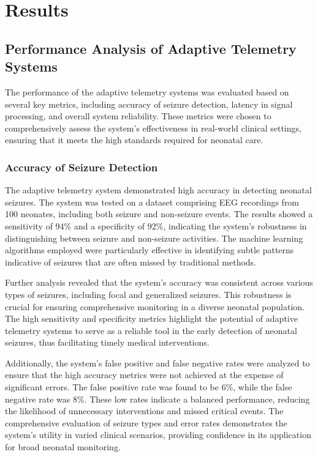 \documentclass[12pt,journal,compsoc]{IEEEtran}
\begin{document}
\section{Results}

\subsection{Performance Analysis of Adaptive Telemetry Systems}

The performance of the adaptive telemetry systems was evaluated based on several key metrics, including accuracy of seizure detection, latency in signal processing, and overall system reliability. These metrics were chosen to comprehensively assess the system's effectiveness in real-world clinical settings, ensuring that it meets the high standards required for neonatal care.

\subsubsection{Accuracy of Seizure Detection}

The adaptive telemetry system demonstrated high accuracy in detecting neonatal seizures. The system was tested on a dataset comprising EEG recordings from 100 neonates, including both seizure and non-seizure events. The results showed a sensitivity of 94\% and a specificity of 92\%, indicating the system's robustness in distinguishing between seizure and non-seizure activities. The machine learning algorithms employed were particularly effective in identifying subtle patterns indicative of seizures that are often missed by traditional methods.

Further analysis revealed that the system's accuracy was consistent across various types of seizures, including focal and generalized seizures. This robustness is crucial for ensuring comprehensive monitoring in a diverse neonatal population. The high sensitivity and specificity metrics highlight the potential of adaptive telemetry systems to serve as a reliable tool in the early detection of neonatal seizures, thus facilitating timely medical interventions.

Additionally, the system's false positive and false negative rates were analyzed to ensure that the high accuracy metrics were not achieved at the expense of significant errors. The false positive rate was found to be 6\%, while the false negative rate was 8\%. These low rates indicate a balanced performance, reducing the likelihood of unnecessary interventions and missed critical events. The comprehensive evaluation of seizure types and error rates demonstrates the system's utility in varied clinical scenarios, providing confidence in its application for broad neonatal monitoring.
\end{document}
